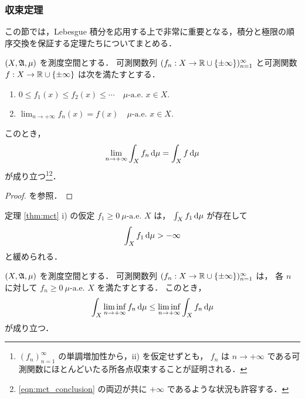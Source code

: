 \subsubsection{収束定理}

この節では，Lebesgue 積分を応用する上で非常に重要となる，積分と極限の順序交換を保証する定理たちについてまとめる．

\begin{theorem}[単調収束定理]\label{thm:mct}
    $(X,\mathfrak{A},\mu)$ を測度空間とする．
    可測関数列 $(f_n:X\to\mathbb{R}\cup\{\pm\infty\})_{n=1}^\infty$ と可測関数 $f:X\to\mathbb{R}\cup\{\pm\infty\}$ は次を満たすとする．
    \begin{enumerate}
        \item $0\le f_1(x)\le f_2(x)\le\cdots\quad\text{$\mu$-a.e.\ $x\in X$}.$
        \item $\displaystyle\lim_{n\to+\infty}f_n(x)=f(x)\quad\text{$\mu$-a.e.\ $x\in X$}$.
    \end{enumerate}
    このとき，
    \begin{align}
        \lim_{n\to+\infty}\int_Xf_n\,\mathrm{d}\mu=\int_Xf\,\mathrm{d}\mu
        \label{eqn:mct_conclusion}
    \end{align}
    が成り立つ\footnote{
        $(f_n)_{n=1}^\infty$ の単調増加性から，\textrm{ii)} を仮定せずとも，
        $f_n$ は $n\to+\infty$ である可測関数にほとんどいたる所各点収束することが証明される．
    }\footnote{\eqref{eqn:mct_conclusion} の両辺が共に $+\infty$ であるような状況も許容する．}．
\end{theorem}

\begin{proof}
    \cite[定理 13.2]{It63} を参照．
\end{proof}

\begin{remark}
    定理 \ref{thm:mct} \textrm{i)} の仮定 $f_1\ge0\ \text{$\mu$-a.e.\ $X$}$ は，
    $\int_Xf_1\,\mathrm{d}\mu$ が存在して
    \begin{align*}
        \int_Xf_1\,\mathrm{d}\mu>-\infty
    \end{align*}
    と緩められる．
\end{remark}

\begin{lemma}\label{lem:Fatou}
    $(X,\mathfrak{A},\mu)$ を測度空間とする．
    可測関数列 $(f_n:X\to\mathbb{R}\cup\{\pm\infty\})_{n=1}^\infty$ は，
    各 $n$ に対して $f_n\ge0\ \text{$\mu$-a.e.\ $X$}$ を満たすとする．
    このとき，
    \begin{align*}
        \int_X\liminf_{n\to+\infty}f_n\,\mathrm{d}\mu\le\liminf_{n\to+\infty}\int_Xf_n\,\mathrm{d}\mu
    \end{align*}
    が成り立つ．
\end{lemma}

